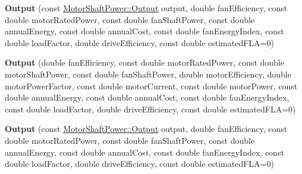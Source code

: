 \begin{DoxyCompactItemize}
{\bfseries Output} (const \hyperlink{struct_motor_shaft_power_1_1_output}{Motor\+Shaft\+Power\+::\+Output} output, double fan\+Efficiency, const double motor\+Rated\+Power, const double fan\+Shaft\+Power, const double annual\+Energy, const double annual\+Cost, const double fan\+Energy\+Index, const double load\+Factor, double drive\+Efficiency, const double estimated\+F\+LA=0)
\item 
\mbox{\label{struct_fan_result_1_1_output_ac4dd55df5e54acf32b19f7d003798d8b}} 
{\bfseries Output} (double fan\+Efficiency, const double motor\+Rated\+Power, const double motor\+Shaft\+Power, const double fan\+Shaft\+Power, double motor\+Efficiency, double motor\+Power\+Factor, const double motor\+Current, const double motor\+Power, const double annual\+Energy, const double annual\+Cost, const double fan\+Energy\+Index, const double load\+Factor, double drive\+Efficiency, const double estimated\+F\+LA=0)
\item 
\mbox{\label{struct_fan_result_1_1_output_a103b3489c1962b9698293bc029bb1bbe}} 
{\bfseries Output} (const \hyperlink{struct_motor_shaft_power_1_1_output}{Motor\+Shaft\+Power\+::\+Output} output, double fan\+Efficiency, const double motor\+Rated\+Power, const double fan\+Shaft\+Power, const double annual\+Energy, const double annual\+Cost, const double fan\+Energy\+Index, const double load\+Factor, double drive\+Efficiency, const double estimated\+F\+LA=0)
\end{DoxyCompactItemize}
